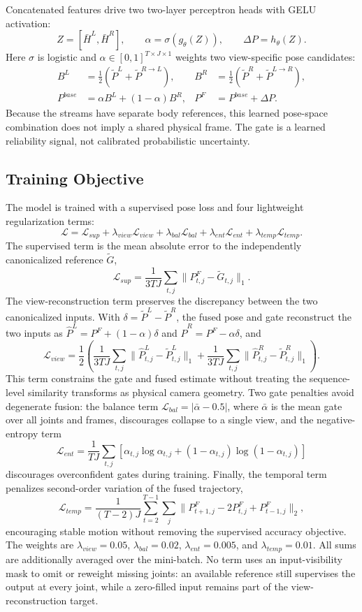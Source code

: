 \documentclass[preprint,12pt]{elsarticle}
\begin{document}
Concatenated features drive two two-layer perceptron heads with GELU activation:
\[
Z=[\bar{H}^{L},\bar{H}^{R}],\qquad
\alpha=\sigma(g_{\theta}(Z)),\qquad
\Delta P=h_{\theta}(Z).
\]
Here \(\sigma\) is logistic and \(\alpha\in[0,1]^{T\times J\times1}\) weights two view-specific pose candidates:
\[
\begin{aligned}
B^{L}&=\tfrac12(\tilde{P}^{L}+\tilde{P}^{R\rightarrow L}),&
B^{R}&=\tfrac12(\tilde{P}^{R}+\tilde{P}^{L\rightarrow R}),\\
P^{base}&=\alpha B^{L}+(1-\alpha)B^{R},&
P^{F}&=P^{base}+\Delta P.
\end{aligned}
\]
Because the streams have separate body references, this learned pose-space combination does not imply a shared physical frame. The gate is a learned reliability signal, not calibrated probabilistic uncertainty.

\subsection{Training Objective}
\label{subsec:training_objective}

The model is trained with a supervised pose loss and four lightweight regularization terms:
\[
\mathcal{L}
=
\mathcal{L}_{sup}
+
\lambda_{view}\mathcal{L}_{view}
+
\lambda_{bal}\mathcal{L}_{bal}
+
\lambda_{ent}\mathcal{L}_{ent}
+
\lambda_{temp}\mathcal{L}_{temp}.
\]
The supervised term is the mean absolute error to the independently canonicalized reference \(\tilde{G}\),
\[
\mathcal{L}_{sup}=\frac{1}{3TJ}\sum_{t,j}\|P^{F}_{t,j}-\tilde{G}_{t,j}\|_{1}.
\]
The view-reconstruction term preserves the discrepancy between the two canonicalized inputs. With \(\delta=\tilde{P}^{L}-\tilde{P}^{R}\), the fused pose and gate reconstruct the two inputs as \(\hat{P}^{L}=P^{F}+(1-\alpha)\delta\) and \(\hat{P}^{R}=P^{F}-\alpha\delta\), and
\[
\mathcal{L}_{view}=\frac{1}{2}\left(\frac{1}{3TJ}\sum_{t,j}\|\hat{P}^{L}_{t,j}-\tilde{P}^{L}_{t,j}\|_{1}
+\frac{1}{3TJ}\sum_{t,j}\|\hat{P}^{R}_{t,j}-\tilde{P}^{R}_{t,j}\|_{1}\right).
\]
This term constrains the gate and fused estimate without treating the sequence-level similarity transforms as physical camera geometry. Two gate penalties avoid degenerate fusion: the balance term \(\mathcal{L}_{bal}=|\bar{\alpha}-0.5|\), where \(\bar{\alpha}\) is the mean gate over all joints and frames, discourages collapse to a single view, and the negative-entropy term
\[
\mathcal{L}_{ent}=\frac{1}{TJ}\sum_{t,j}\left[\alpha_{t,j}\log\alpha_{t,j}+(1-\alpha_{t,j})\log(1-\alpha_{t,j})\right]
\]
discourages overconfident gates during training. Finally, the temporal term penalizes second-order variation of the fused trajectory,
\[
\mathcal{L}_{temp}=\frac{1}{(T-2)J}\sum_{t=2}^{T-1}\sum_{j}\|P^{F}_{t+1,j}-2P^{F}_{t,j}+P^{F}_{t-1,j}\|_{2},
\]
encouraging stable motion without removing the supervised accuracy objective. The weights are \(\lambda_{view}=0.05\), \(\lambda_{bal}=0.02\), \(\lambda_{ent}=0.005\), and \(\lambda_{temp}=0.01\). All sums are additionally averaged over the mini-batch. No term uses an input-visibility mask to omit or reweight missing joints: an available reference still supervises the output at every joint, while a zero-filled input remains part of the view-reconstruction target.
\end{document}
